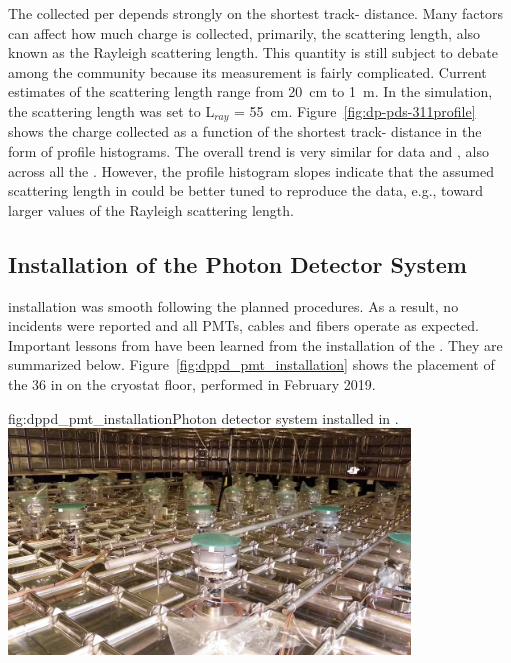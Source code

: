 
The  collected per  depends strongly on the shortest track- distance. Many factors can affect how much charge is collected, primarily, the scattering length, also known as the Rayleigh scattering length. This quantity is still subject to debate among the  community because its measurement is fairly complicated. Current estimates of the scattering length range from \SI{20}{\cm} to \SI{1}{\m}.
In the  simulation, the scattering length was set to L$_{ray}$ = \SI{55}{\cm}.
Figure~\ref{fig:dp-pds-311profile} shows the charge collected as a function of the shortest track- distance in the form of profile histograms. The overall trend is very similar for data and , also across all the . However, the profile histogram slopes indicate that the assumed scattering length in  could be better tuned to reproduce the data, e.g., toward larger values of the Rayleigh scattering length.


\subsection{Installation of the  Photon Detector System}

  installation was smooth following the planned procedures. As a result, no incidents were reported and all PMTs, cables and fibers operate as expected. Important lessons from  have been learned from the installation of the  . They are summarized below. Figure~\ref{fig:dppd_pmt_installation} shows the placement of the \num{36}  in  on the cryostat floor, performed in February 2019.

\begin{dunefigure}{fig:dppd_pmt_installation}{Photon detector system installed in .}
\includegraphics[width=0.8\textwidth]{graphics/dppd_pmt_installation.jpg}
\end{dunefigure}

